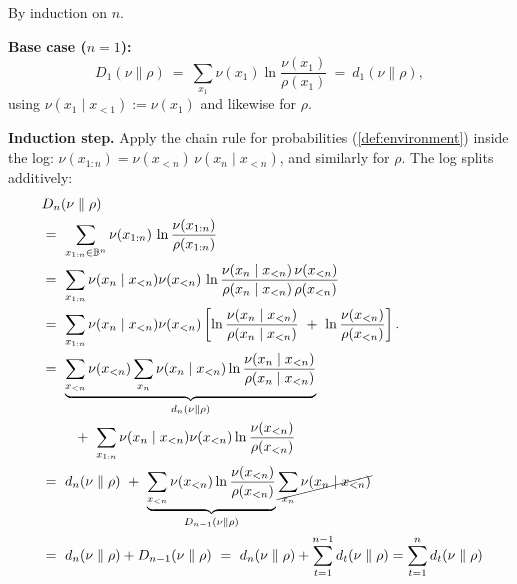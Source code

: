 \documentclass[fontsize=11pt, parskip=half]{scrartcl}
\begin{document}
\begin{solution}
By induction on $n$.

\textbf{Base case ($n = 1$):}
\[
  D_1(\nu \parallel \rho) ~=~ \sum_{x_1} \nu(x_1) \ln \frac{\nu(x_1)}{\rho(x_1)} ~=~ d_1(\nu \parallel \rho),
\]
using $\nu(x_1 \mid x_{<1}) := \nu(x_1)$ and likewise for $\rho$.

\textbf{Induction step.} Apply the chain rule for probabilities (\cref{def:environment}) inside the log: $\nu(x_{1:n}) = \nu(x_{<n})\,\nu(x_n \mid x_{<n})$, and similarly for $\rho$. The log splits additively:
\begin{align*}
  & D_n(\nu \parallel \rho) \\
  ~&=~ \sum_{x_{1:n} \in \mathbb{B}^n} \nu(x_{1:n}) \,\ln \frac{\nu(x_{1:n})}{\rho(x_{1:n})} \\
  ~&=~ \sum_{x_{1:n}} \nu(x_n \mid x_{<n}) \nu(x_{<n}) \,\ln \frac{\nu(x_n \mid x_{<n})\,\nu(x_{<n})}
  {\rho(x_n \mid x_{<n})\,\rho(x_{<n})} \\
  ~&=~ \sum_{x_{1:n}} \nu(x_n \mid x_{<n}) \nu(x_{<n}) 
  \left[\ln \frac{\nu(x_n \mid x_{<n})}{\rho(x_n \mid x_{<n})} ~+~ \ln \frac{\nu(x_{<n})}{\rho(x_{<n})}\right]. \\
  ~&=~ \underbrace{\sum_{x_{<n}} \nu(x_{<n}) \sum_{x_n} \nu(x_n \mid x_{<n})  \ln \frac{\nu(x_n \mid x_{<n})}{\rho(x_n \mid x_{<n})} }_{d_n(\nu \parallel \rho)} \\
  &\qquad ~+~
  \sum_{x_{1:n}} \nu(x_n \mid x_{<n}) \nu(x_{<n}) \ln \frac{\nu(x_{<n})}{\rho(x_{<n})} \\
  ~&=~ d_n(\nu \parallel \rho) ~+~
  \underbrace{\sum_{x_{<n}}  \nu(x_{<n}) \ln \frac{\nu(x_{<n})}{\rho(x_{<n})}}_{D_{n-1}(\nu \parallel \rho)} \cancel{\sum_{x_n} \nu(x_n \mid x_{<n})} \\
  ~&=~ d_n(\nu \parallel \rho) + D_{n-1}(\nu \parallel \rho) 
  ~=~ d_n(\nu \parallel \rho) + \sum_{t=1}^{n-1} d_t(\nu \parallel \rho)  = \sum_{t=1}^{n} d_t(\nu \parallel \rho)
\end{align*}
\end{solution}
\end{document}
